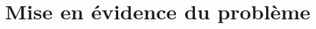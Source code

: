 
\def\xxactivite{Cours}

\def\xxauteur{Emilien Durif -- Xavier Pessoles}
\fichefalse \proftrue \tdfalse \courstrue

\def\xxnumchapitre{Chapitre 7 \vspace{.2cm}}

\def\xxchapitre{Complexité algorithmique }

\def\xxcompetences{%
\textsl{%
\textbf{Savoirs et compétences :}\\
\begin{itemize}[label=\ding{112},font=\color{bleuxp}] 
\item Complexité.
\end{itemize}
}}

\def\xxfigures{
}%


\setlength{\columnseprule}{.1pt}

\vspace{2cm}
\pagestyle{fancy}
\thispagestyle{plain}
\section{Mise en évidence du problème}

